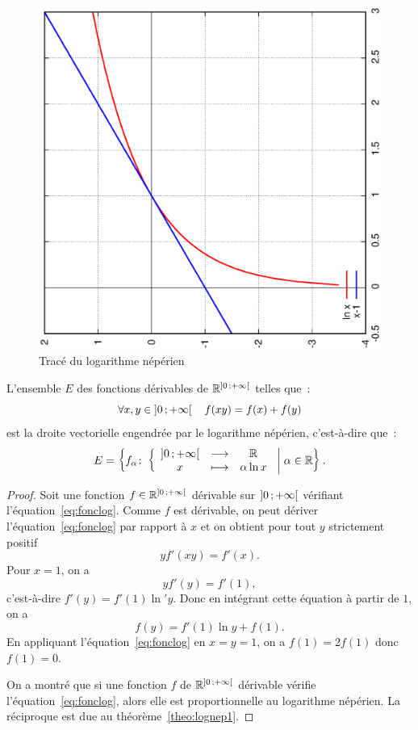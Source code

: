 %
\begin{figure}
  \centering
  \includegraphics[scale=0.4, angle=-90]{lognep.ps}
  \caption{Tracé du logarithme népérien}
  \label{fig:traceln}
\end{figure}
%
\begin{theo}
  L'ensemble $E$ des fonctions dérivables de $\mathbb{R}^{\left] 0 \, ;  +\infty \right[}$ telles que~:
  \begin{equation}
    \label{eq:fonclog}
    \forall x, y \in \left] 0 \, ;  +\infty \right[ \quad f(xy)=f(x)+f(y)
  \end{equation}
  est la droite vectorielle engendrée par le logarithme népérien, c'est-à-dire que~:
  \begin{equation}
    E=\left\{f_{\alpha}\colon \left\{\begin{array}{ccc} \left] 0 \, ;  +\infty \right[ & \longrightarrow &\mathbb{R}\\ x & \longmapsto & \alpha \ln x \end{array} \right.\mathrel{}\middle|\mathrel{}\alpha \in \mathbb{R}\right\}.
  \end{equation}
\end{theo}
\begin{proof}
  Soit une fonction $f \in \mathbb{R}^{\left] 0 \, ;  +\infty \right[}$ dérivable sur $\left] 0 \, ;  +\infty \right[$ vérifiant l'équation~\eqref{eq:fonclog}. Comme $f$ est dérivable, on peut dériver l'équation~\eqref{eq:fonclog} par rapport à $x$ et on obtient pour tout $y$ strictement positif
  \begin{equation}
    y f'(xy)=f'(x).
  \end{equation}
  Pour $x=1$, on a
  \begin{equation}
    y f'(y)=f'(1),
  \end{equation}
  c'est-à-dire $f'(y)=f'(1) \ln' y$. Donc en intégrant cette équation à partir de $1$, on a
  \begin{equation}
    f(y)=f'(1)\ln y + f(1).
  \end{equation}
  En appliquant l'équation~\eqref{eq:fonclog} en $x=y=1$, on a $f(1)=2f(1)$ donc $f(1)=0$.

  On a montré que si une fonction $f$ de $\mathbb{R}^{\left] 0 \, ;  +\infty \right[}$ dérivable vérifie l'équation~\eqref{eq:fonclog}, alors elle est proportionnelle au logarithme népérien. La réciproque est due au théorème~\ref{theo:lognep1}.
\end{proof}
%
